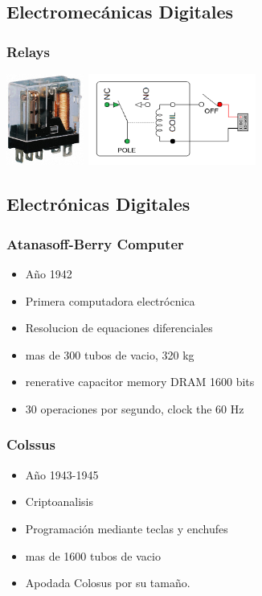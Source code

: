 \documentclass{beamer}
\begin{document}
\subsection{Electromecánicas Digitales}
\begin{frame}
\frametitle{Relays}
\begin{center}
\hfill
\includegraphics[height=3cm]{relay-imagen.jpg}
\hfill
\includegraphics[height=3cm]{relay-diagrama.png}
\end{center}
\end{frame}

\subsection{Electrónicas Digitales}
\begin{frame}
\frametitle{Atanasoff-Berry Computer}
\begin{itemize}
	\item Año 1942
	\item Primera computadora electrócnica 
	\item Resolucion de equaciones diferenciales
	\item mas de 300 tubos de vacio, 320 kg
	\item renerative capacitor memory DRAM 1600 bits
	\item 30 operaciones por segundo, clock the 60 Hz
\end{itemize}
\end{frame}

\begin{frame}
\frametitle{Colssus}
\begin{itemize}
	\item Año 1943-1945
	\item Criptoanalisis
	\item Programación mediante teclas y enchufes
	\item mas de 1600 tubos de vacio
	\item Apodada Colosus por su tamaño.
\end{itemize}
\end{frame}
\end{document}

